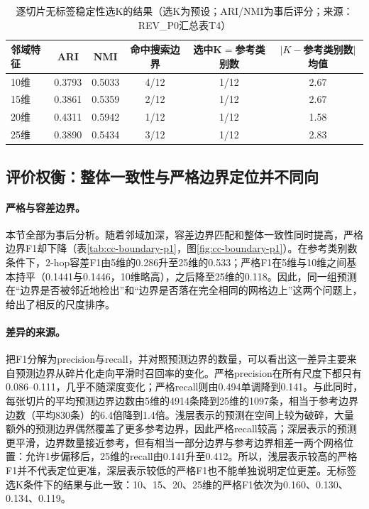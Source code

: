 \begin{table}[htbp]
\centering
\caption{逐切片无标签稳定性选K的结果（选K为预设；ARI/NMI为事后评分；来源：REV\_P0汇总表T4）}
\label{tab:cc-autok-p1}
\small
\begin{tabular}{lccccc}
\toprule
邻域特征 & ARI & NMI & 命中搜索边界 & 选中K$=$参考类别数 & $|K-$参考类别数$|$均值\\
\midrule
10维 & 0.3793 & 0.5033 & 4/12 & 1/12 & 2.67\\
15维 & 0.3861 & 0.5359 & 2/12 & 1/12 & 2.67\\
20维 & 0.4311 & 0.5942 & 1/12 & 1/12 & 1.58\\
25维 & 0.3890 & 0.5434 & 3/12 & 1/12 & 2.83\\
\bottomrule
\end{tabular}
\end{table}

\subsection{评价权衡：整体一致性与严格边界定位并不同向}
\label{subsec:cc-res-boundary-p1}

\paragraph{严格与容差边界。}本节全部为事后分析。随着邻域加深，容差边界匹配和整体一致性同时提高，严格边界F1却下降（表\ref{tab:cc-boundary-p1}，图\ref{fig:cc-boundary-p1}）。在参考类别数条件下，2-hop容差F1由5维的0.286升至25维的0.533；严格F1在5维与10维之间基本持平（0.1441与0.1446，10维略高），之后降至25维的0.118。因此，同一组预测在“边界是否被邻近地检出”和“边界是否落在完全相同的网格边上”这两个问题上，给出了相反的尺度排序。

\paragraph{差异的来源。}把F1分解为precision与recall，并对照预测边界的数量，可以看出这一差异主要来自预测边界从碎片化走向平滑时召回率的变化。严格precision在所有尺度下都只有0.086--0.111，几乎不随深度变化；严格recall则由0.494单调降到0.141。与此同时，每张切片的平均预测边界边数由5维的4914条降到25维的1097条，相当于参考边界边数（平均830条）的6.4倍降到1.4倍。浅层表示的预测在空间上较为破碎，大量额外的预测边界偶然覆盖了更多参考边界，因此严格recall较高；深层表示的预测更平滑，边界数量接近参考，但有相当一部分边界与参考边界相差一两个网格位置：允许1步偏移后，25维的recall由0.141升至0.412。所以，浅层表示较高的严格F1并不代表定位更准，深层表示较低的严格F1也不能单独说明定位更差。无标签选K条件下的结果与此一致：10、15、20、25维的严格F1依次为0.160、0.130、0.134、0.119。

